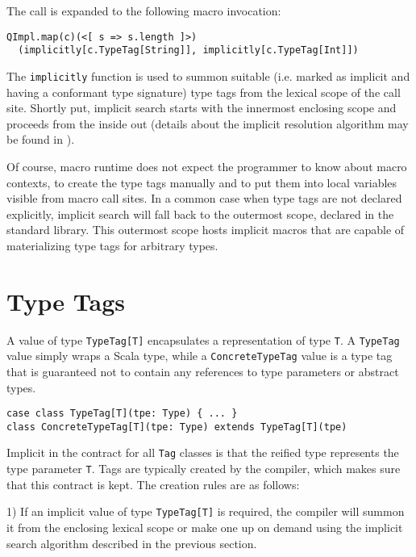 \documentclass{llncs}
\begin{document}
\noindent
The call is expanded to the following macro invocation:
\noindent

\begin{lstlisting}
QImpl.map(c)(<[ s => s.length ]>)
  (implicitly[c.TypeTag[String]], implicitly[c.TypeTag[Int]])
\end{lstlisting}

The \lstinline$implicitly$ function is used to summon suitable (i.e. marked as implicit and having a conformant type signature) type tags from the lexical scope of the call site. Shortly put, implicit search starts with the innermost enclosing scope and proceeds from the inside out (details about the implicit resolution algorithm may be found in \cite{odersky11}).

Of course, macro runtime does not expect the programmer to know about macro contexts, to create the type tags manually and to put them into local variables visible from macro call sites. In a common case when type tags are not declared explicitly, implicit search will fall back to the outermost scope, declared in the standard library. This outermost scope hosts implicit macros that are capable of materializing type tags for arbitrary types.

\section{Type Tags}

A value of type \lstinline$TypeTag[T]$ encapsulates a representation of type \lstinline$T$. A \lstinline$TypeTag$ value simply wraps a Scala type, while a \lstinline$ConcreteTypeTag$ value is a type tag that is guaranteed not to contain any references to type parameters or abstract types.

\begin{lstlisting}
case class TypeTag[T](tpe: Type) { ... }
class ConcreteTypeTag[T](tpe: Type) extends TypeTag[T](tpe)
\end{lstlisting}

Implicit in the contract for all \lstinline$Tag$ classes is that the reified type represents the type parameter \lstinline$T$. Tags are typically created by the compiler, which makes sure that this contract is kept. The creation rules are as follows:

1) If an implicit value of type \lstinline$TypeTag[T]$ is required, the compiler will summon it from the enclosing lexical scope or make one up on demand using the implicit search algorithm described in the previous section.
\end{document}
